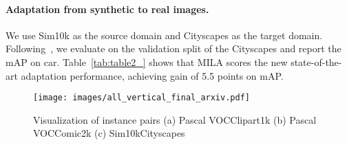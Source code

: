 \documentclass{bmvc2k}
\begin{document}
\paragraph{Adaptation from synthetic to real images.}
We use Sim10k as the source domain and Cityscapes as the target domain. Following~\cite{jiang2021decoupled}, we evaluate on the validation split of the Cityscapes and report the mAP on car. Table~\ref{tab:table2_} shows that MILA scores the new state-of-the-art adaptation performance, achieving gain of 5.5 points on mAP.
































































































\begin{figure*}[t!]
  \centering
  \texttt{[image: images/all\_vertical\_final\_arxiv.pdf]}
  \caption{Visualization of instance pairs (a) Pascal VOCClipart1k (b) Pascal VOCComic2k (c) Sim10kCityscapes}
  \label{fig:fig100}
\end{figure*}
\end{document}
